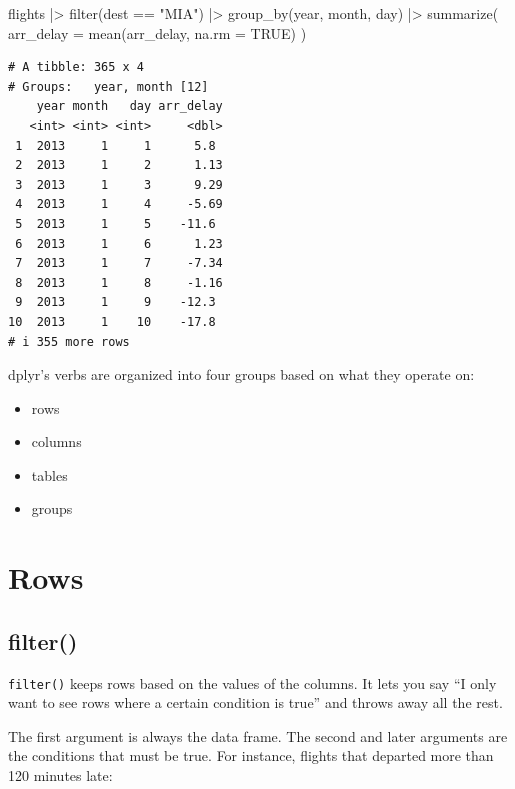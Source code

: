\documentclass[
  letterpaper,
  DIV=11,
  numbers=noendperiod]{scrreprt}
\newenvironment{Shaded}{\begin{snugshade}}{\end{snugshade}}
\newcommand{\AttributeTok}[1]{\textcolor[rgb]{0.40,0.45,0.13}{#1}}
\newcommand{\ConstantTok}[1]{\textcolor[rgb]{0.56,0.35,0.01}{#1}}
\newcommand{\FunctionTok}[1]{\textcolor[rgb]{0.28,0.35,0.67}{#1}}
\newcommand{\NormalTok}[1]{\textcolor[rgb]{0.00,0.23,0.31}{#1}}
\newcommand{\SpecialCharTok}[1]{\textcolor[rgb]{0.37,0.37,0.37}{#1}}
\newcommand{\StringTok}[1]{\textcolor[rgb]{0.13,0.47,0.30}{#1}}
\providecommand{\tightlist}{%
  \setlength{\itemsep}{0pt}\setlength{\parskip}{0pt}}
\begin{document}
\begin{Shaded}
\begin{Highlighting}[]
\NormalTok{flights }\SpecialCharTok{|\textgreater{}}
  \FunctionTok{filter}\NormalTok{(dest }\SpecialCharTok{==} \StringTok{"MIA"}\NormalTok{) }\SpecialCharTok{|\textgreater{}}
  \FunctionTok{group\_by}\NormalTok{(year, month, day) }\SpecialCharTok{|\textgreater{}}
  \FunctionTok{summarize}\NormalTok{(}
    \AttributeTok{arr\_delay =} \FunctionTok{mean}\NormalTok{(arr\_delay, }\AttributeTok{na.rm =} \ConstantTok{TRUE}\NormalTok{)}
\NormalTok{  )}
\end{Highlighting}
\end{Shaded}

\begin{verbatim}
# A tibble: 365 x 4
# Groups:   year, month [12]
    year month   day arr_delay
   <int> <int> <int>     <dbl>
 1  2013     1     1      5.8 
 2  2013     1     2      1.13
 3  2013     1     3      9.29
 4  2013     1     4     -5.69
 5  2013     1     5    -11.6 
 6  2013     1     6      1.23
 7  2013     1     7     -7.34
 8  2013     1     8     -1.16
 9  2013     1     9    -12.3 
10  2013     1    10    -17.8 
# i 355 more rows
\end{verbatim}

dplyr's verbs are organized into four groups based on what they operate
on:

\begin{itemize}
\tightlist
\item
  rows
\item
  columns
\item
  tables
\item
  groups
\end{itemize}

\section{Rows}\label{rows}

\subsection{filter()}\label{filter}

\texttt{filter()} keeps rows based on the values of the columns. It lets
you say ``I only want to see rows where a certain condition is true''
and throws away all the rest.

The first argument is always the data frame. The second and later
arguments are the conditions that must be true. For instance, flights
that departed more than 120 minutes late:
\end{document}
